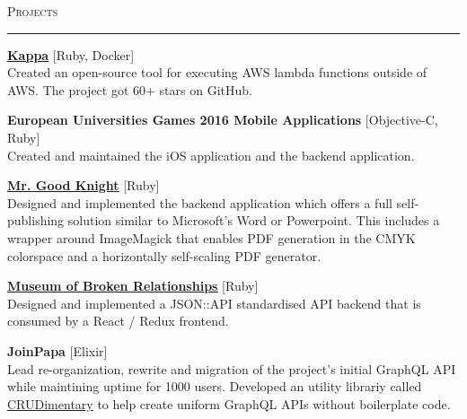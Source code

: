 \documentclass[10pt, a4paper, final, onecolumn, oneside, notitlepage]{article}
\newcommand{\sectionspacing}[0]{ \vspace{10pt} } %
\newcommand{\sectionrule}[0]{ \rule[6pt]{\textwidth}{0.5pt} } %
\renewcommand{\section}[1]{\sectionspacing {\large \scshape #1} \sectionrule}
\begin{document}
\begin{center}
  \section{Projects}
  \begin{flushleft}
    \textbf {\href{https://github.com/monorkin/kappa}{\underline{Kappa}}} [Ruby, Docker]\\
    Created an open-source tool for executing AWS lambda functions outside of AWS. The project got 60+ stars on GitHub.
    \vspace{2mm}

    \textbf{European Universities Games 2016 Mobile Applications} [Objective-C, Ruby]\\
    Created and maintained the iOS application and the backend application. \\
    \vspace{2mm}

    \textbf{\href{https://www.mrgoodknight.de/}{\underline{Mr. Good Knight}}} [Ruby]\\
    Designed and implemented the backend application which offers a full
    self-publishing solution similar to Microsoft's Word or Powerpoint.
    This includes a wrapper around ImageMagick that enables PDF generation in the
    CMYK colorspace and a horizontally self-scaling PDF generator. \\
    \vspace{2mm}

    \textbf{\href{https://brokenships.com}{\underline{Museum of Broken Relationships}}} [Ruby]\\
    Designed and implemented a JSON::API standardised API backend that is
    consumed by a React / Redux frontend. \\
    \vspace{2mm}

    \textbf{JoinPapa} [Elixir]\\
    Lead re-organization, rewrite and migration of the project's initial
    GraphQL API while maintining uptime for 1000 users. Developed an utility
    librariy called \href{https://github.com/monorkin/crudimentary/}{\underline{CRUDimentary}}
    to help create uniform GraphQL APIs without boilerplate code.
    \vspace{2mm}



\end{flushleft}
\end{center}
\end{document}
